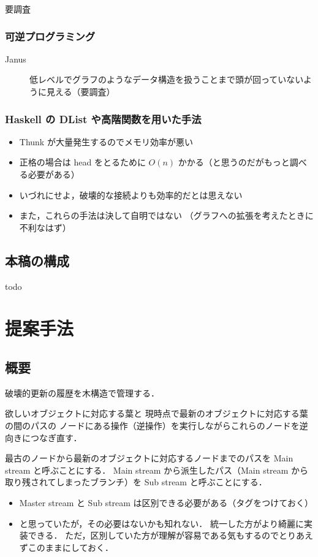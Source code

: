 \documentclass[10pt, a4j, twocolumn]{scrartcl}
\begin{document}
要調査

\subsubsection{可逆プログラミング}
\label{sec:orgdf1aafa}
\begin{description}
\item[{Janus}] 低レベルでグラフのようなデータ構造を扱うことまで頭が回っていないように見える（要調査）
\end{description}


\subsubsection{Haskell の DList や高階関数を用いた手法}
\label{sec:orgfeb38bc}
\begin{itemize}
\item Thunk が大量発生するのでメモリ効率が悪い
\item 正格の場合は head をとるために \(O(n)\) かかる（と思うのだがもっと調べる必要がある）
\item いづれにせよ，破壊的な接続よりも効率的だとは思えない
\item また，これらの手法は決して自明ではない
（グラフへの拡張を考えたときに不利なはず）
\end{itemize}


\subsection{本稿の構成}
\label{sec:org766570f}

todo


\section{提案手法}
\label{sec:org56b1a79}

\subsection{概要}
\label{sec:orgcac9c8a}

破壊的更新の履歴を木構造で管理する．

欲しいオブジェクトに対応する葉と
現時点で最新のオブジェクトに対応する葉の間のパスの
ノードにある操作（逆操作）を実行しながらこれらのノードを逆向きにつなぎ直す．

最古のノードから最新のオブジェクトに対応するノードまでのパスを
Main stream と呼ぶことにする．
Main stream から派生したパス（Main stream から取り残されてしまったブランチ）を
Sub stream と呼ぶことにする．
\begin{itemize}
\item Master stream と Sub stream は区別できる必要がある（タグをつけておく）
\item と思っていたが，その必要はないかも知れない．
統一した方がより綺麗に実装できる．
ただ，区別していた方が理解が容易である気もするのでとりあえずこのままにしておく．
\end{itemize}
\end{document}
